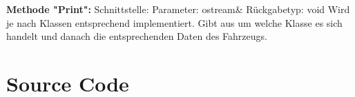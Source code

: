 \documentclass[12pt,a4paper]{article}
\begin{document}
\textbf {Methode "Print": } 
\newline
Schnittstelle:
\newline
Parameter: ostream\&
\newline
Rückgabetyp: void
\newline
Wird je nach Klassen entsprechend implementiert. Gibt aus um welche Klasse es sich handelt und danach die entsprechenden Daten des Fahrzeugs.
\\


\newpage
\section {Source Code}



\newpage


\newpage


\newpage

\newpage


\newpage

\newpage


\newpage

\newpage


\newpage

\newpage


\newpage

\newpage


\newpage

\newpage


\newpage

\newpage


\newpage

\newpage


\newpage

\newpage


\newpage

\newpage
\end{document}
